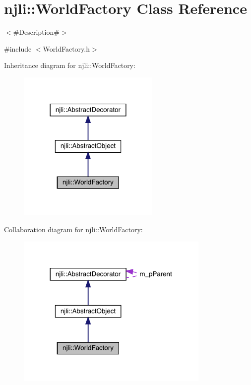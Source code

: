 \hypertarget{classnjli_1_1_world_factory}{}\section{njli\+:\+:World\+Factory Class Reference}
\label{classnjli_1_1_world_factory}


$<$\#\+Description\#$>$  




{\ttfamily \#include $<$World\+Factory.\+h$>$}



Inheritance diagram for njli\+:\+:World\+Factory\+:\nopagebreak
\begin{figure}[H]
\begin{center}
\leavevmode
\includegraphics[width=194pt]{classnjli_1_1_world_factory__inherit__graph}
\end{center}
\end{figure}


Collaboration diagram for njli\+:\+:World\+Factory\+:\nopagebreak
\begin{figure}[H]
\begin{center}
\leavevmode
\includegraphics[width=264pt]{classnjli_1_1_world_factory__coll__graph}
\end{center}
\end{figure}
